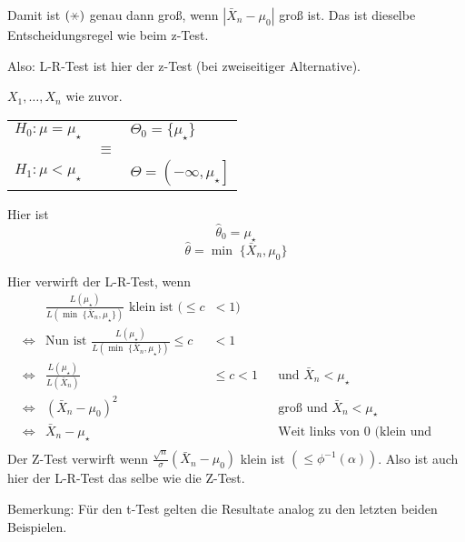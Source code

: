 \documentclass{tstextbook}
\begin{document}
\begin{example}
	Damit ist $ (\hexstar) $ genau dann groß, wenn $ |\bar{X}_n-\mu_0| $ groß ist. Das ist dieselbe Entscheidungsregel wie beim z-Test. 
	
	Also: L-R-Test ist hier der z-Test (bei zweiseitiger Alternative).
	
\end{example}

\begin{example}
	$ X_1,\ldots,X_n $ wie zuvor. 
	
	\begin{center}
	\begin{tabular}{lcl}
		$ H_0 \colon \mu=\mu_\star $ & & $ \Theta_0 = \{\mu_\star\}$ \\
			& $\equiv$ & \\
		$ H_1 \colon \mu < \mu_\star $ & & $ \Theta=\left(-\infty,\mu_\star \right] $
	\end{tabular}
	\end{center}

	Hier ist \[ \hat{\theta}_0 = \mu_\star \]  \[  \hat{\theta} = \min \; \{\bar{X}_n,\mu_0\}  \]

	Hier verwirft der L-R-Test, wenn 
	\[
	\begin{aligned}
	& & \frac{L(\mu_\star )}{L(\min \; \{\bar{X}_n,\mu_\star\})} \text{ klein ist } ( \le c & <1) &\\
	& \Leftrightarrow & \text{Nun ist } \frac{L(\mu_\star )}{L(\min \; \{\bar{X}_n,\mu_\star\})} \le c & <1 &\\
	& \Leftrightarrow & \frac{L(\mu_\star )}{L(\bar{X}_n)} & \le c <1 &  &\text{und } \bar{X}_n < \mu_\star \\
	& \Leftrightarrow & (\bar{X}_n-\mu_0)^2 & & & \text{groß und } \bar{X}_n < \mu_\star \\
	& \Leftrightarrow & \bar{X}_n -\mu_\star  & & & \text{Weit links von 0 (klein und negativ)} \\
	\end{aligned}
	\] 
	Der Z-Test verwirft wenn $ \frac{\sqrt{n}}{\sigma}{(\bar{X}_n-\mu_0)} $ klein ist $(\leq \phi^{-1}(\alpha))$. Also ist auch hier der L-R-Test das selbe wie die Z-Test.
	
\end{example}

\begin{remark}
	Bemerkung: Für den t-Test gelten die Resultate analog zu den letzten beiden Beispielen. 
\end{remark}
\end{document}
